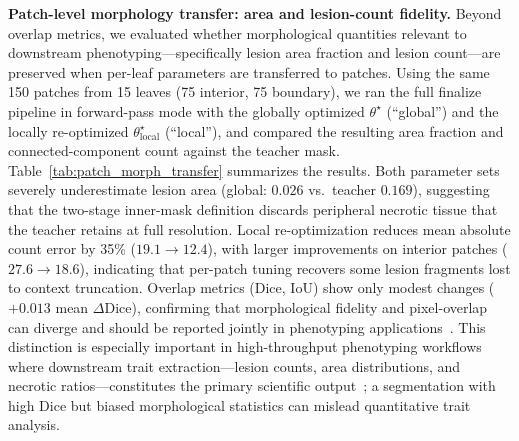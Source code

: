 \documentclass[11pt,a4paper]{article}
\begin{document}
\textbf{Patch-level morphology transfer: area and lesion-count fidelity.}
Beyond overlap metrics, we evaluated whether morphological quantities relevant to downstream phenotyping---specifically lesion area fraction and lesion count---are preserved when per-leaf parameters are transferred to patches.
Using the same 150 patches from 15 leaves (75 interior, 75 boundary), we ran the full finalize pipeline in forward-pass mode with the globally optimized $\theta^\star$ (``global'') and the locally re-optimized $\theta_{\mathrm{local}}^\star$ (``local''), and compared the resulting area fraction and connected-component count against the teacher mask.
Table~\ref{tab:patch_morph_transfer} summarizes the results.
Both parameter sets severely underestimate lesion area (global: $0.026$ vs.\ teacher $0.169$), suggesting that the two-stage inner-mask definition discards peripheral necrotic tissue that the teacher retains at full resolution.
Local re-optimization reduces mean absolute count error by 35\% ($19.1 \to 12.4$), with larger improvements on interior patches ($27.6 \to 18.6$), indicating that per-patch tuning recovers some lesion fragments lost to context truncation.
Overlap metrics (Dice, IoU) show only modest changes ($+0.013$ mean $\Delta$Dice), confirming that morphological fidelity and pixel-overlap can diverge and should be reported jointly in phenotyping applications~\citep{ronneberger2015u}.
This distinction is especially important in high-throughput phenotyping workflows where downstream trait extraction---lesion counts, area distributions, and necrotic ratios---constitutes the primary scientific output~\citep{gehan2017high,plantcv2025}; a segmentation with high Dice but biased morphological statistics can mislead quantitative trait analysis.
\end{document}
